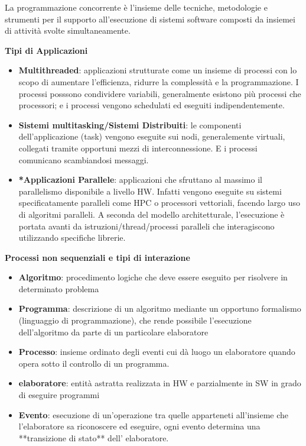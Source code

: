\documentclass{article}
\begin{document}
La programmazione concorrente è l'insieme delle tecniche, metodologie e strumenti per il supporto all'esecuzione di sistemi software composti da insiemei di attività svolte
simultaneamente.

\vspace{5mm}
\textbf{Tipi di Applicazioni}
\begin{itemize}
    \item \textbf{Multithreaded}: applicazioni strutturate come un insieme di processi con lo scopo di aumentare l'efficienza, ridurre la complessità e la programmazione. I processi posssono
    condividere variabili, generalmente esistono più processi che processori; e i processi vengono schedulati ed eseguiti indipendentemente.
    \item \textbf{Sistemi multitasking/Sistemi Distribuiti}: le componenti dell'applicazione (task) vengono eseguite sui nodi, generalemente virtuali, collegati tramite opportuni mezzi
    di interconnessione. E i processi comunicano scambiandosi messaggi.
    \item \textbf{*Applicazioni Parallele}: applicazioni che sfruttano al massimo il parallelismo disponibile a livello HW. Infatti vengono eseguite su sistemi specificatamente paralleli
    come HPC o processori vettoriali, facendo largo uso di algoritmi paralleli. A seconda del modello architetturale, l'esecuzione è portata avanti da istruzioni/thread/processi paralleli
    che interagiscono utilizzando specifiche librerie.
\end{itemize}

\vspace{5mm}
\textbf{Processi non sequenziali e tipi di interazione}

\begin{itemize}
    \item \textbf{Algoritmo}: procedimento logiche che deve essere eseguito per risolvere in determinato problema
    \item \textbf{Programma}: descrizione di un algoritmo mediante un opportuno formalismo (linguaggio di programmazione), che rende possibile l'esecuzione dell'algoritmo da parte di un
    particolare elaboratore
    \item \textbf{Processo}: insieme ordinato degli eventi cui dà luogo un elaboratore quando opera sotto il controllo di un programma.
    \item \textbf{elaboratore}: entità astratta realizzata in HW e parzialmente in SW in grado di eseguire programmi
    \item \textbf{Evento}: esecuzione di un'operazione tra quelle apparteneti all'insieme che l'elaboratore sa riconoscere ed eseguire, ogni evento determina una **transizione di stato**
    dell' elaboratore.
\end{itemize}
\end{document}
